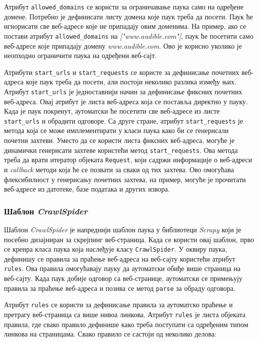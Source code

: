 \documentclass[12pt,oneside]{memoir}
\begin{document}
Атрибут \texttt{allowed\_domains} се користи за ограничавање паука само на одређене домене. Потребно је дефинисати листу домена које паук треба да посети. Паук ће игнорисати све веб-адресе које не припадају овим доменима. На пример, ако се постави атрибут \texttt{allowed\_domains} на \textit{["www.audible.com"]}, паук ће посетити само веб-адресе које припадају домену \textit{www.audible.com}. Ово је корисно уколико је неопходно ограничити паука на одређени веб-сајт.

Атрибути \texttt{start\_urls} и \texttt{start\_requests} се користе за дефинисање почетних веб-адреса које паук треба да посети, али постоји неколико разлика између њих. Атрибут \texttt{start\_urls} је једноставнији начин за дефинисање фиксних почетних веб-адреса. Овај атрибут је листа веб-адреса која се поставља директно у пауку. Када је паук покренут, аутоматски ће посетити све веб-адресе из листе \texttt{start\_urls} и обрадити одговоре. Са друге стране, атрибут \texttt{start\_requests} је метода која се може имплементирати у класи паука како би се генерисали почетни захтеви. Уместо да се користи листа фиксних веб-адреса, могуће је динамички генерисати захтеве користећи метод \texttt{start\_requests}. Ова метода треба да врати итератор објеката \texttt{Request}, који садржи информације о веб-адреси и \textit{callback} методи која ће се позвати за сваки од тих захтева.
Ово омогућава флексибилност у генерисању почетних захтева, на пример, могуће је прочитати веб-адресе из датотеке, базе података и других извора.

\subsubsection{Шаблон \textit{CrawlSpider}}
Шаблон \textit{CrawlSpider} је напреднији шаблон паука у библиотеци \textit{Scrapy} који је посебно дизајниран за скрејпинг веб-страница. Када се користи овај шаблон, прво се креира класа паука која наслеђује класу \texttt{CrawlSpider}. У оквиру паука, дефинишу се правила за праћење веб-адреса на веб-сајту користећи атрибут \texttt{rules}. Ова правила омогућавају пауку да аутоматски обиђе више страница на веб-сајту. Када паук добије одговор са веб-странице, аутоматски се примењују правила за праћење веб-адреса и позива се метод \texttt{parse} за обраду одговора.

Атрибут \texttt{rules} се користи за дефинисање правила за аутоматско праћење и претрагу веб-страница са више нивоа линкова. Атрибут \texttt{rules} је листа објеката правила, где свако правило дефинише како треба поступати са одређеним типом линкова на страницама. Свако правило се састоји од неколико делова:  
\end{document}
